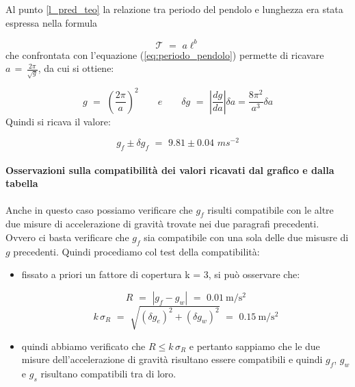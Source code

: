 Al punto \ref{l_pred_teo} la relazione tra periodo del pendolo e lunghezza era stata espressa nella formula

\begin{equation*}
\mathcal{T} \,\, = \,\, a\ell^b
\end{equation*}
%
che confrontata con l'equazione (\ref{eq:periodo_pendolo}) permette di ricavare $a \, = \, \frac{2 \pi}{\sqrt{g}}$, da cui si ottiene:

\begin{equation*}
g \,\, = \,\, \left( \frac{2 \pi}{a}\right)^2 \quad\quad e \quad\quad \delta g \,\, = \,\, \left| \frac{dg}{da} \right|  \delta a = \frac{8 \pi^2}{a^3} \delta a
\end{equation*}
%
Quindi si ricava il valore:

\begin{equation}
g_f \pm \delta g_f \,\, = \,\, 9.81 \pm 0.04 \,\, ms^{-2}
\end{equation}

\paragraph{Osservazioni sulla compatibilità dei valori ricavati dal grafico e dalla tabella\\} 
Anche in questo caso possiamo verificare che $g_f$ risulti compatibile con le altre due misure di accelerazione di gravità trovate nei due paragrafi precedenti. Ovvero ci basta verificare che $g_f$ sia compatibile con una sola delle due misusre di $g$ precedenti. Quindi procediamo col test della compatibilità:
\begin{itemize}
	\item{fissato a priori un fattore di copertura k = 3, si può osservare che:
	
		\begin{equation*}
			R \,\, = \,\, |g_f - g_w| \,\, = \,\, \SI{0.01}{\metre\per\square\second}
		\end{equation*}
		\begin{equation*}
			k\,\sigma_R \,\, = \,\, \sqrt{(\delta g_e)^2 + (\delta g_w)^2} \,\, = \,\, \SI{0.15}{\metre\per\square\second}
		\end{equation*}
		}
	\item{quindi abbiamo verificato che $R \leq k\,\sigma_R$ e pertanto sappiamo che le due misure dell'accelerazione di gravità risultano essere compatibili e quindi $g_f$, $g_w$ e $g_s$ risultano compatibili tra di loro.}
\end{itemize}